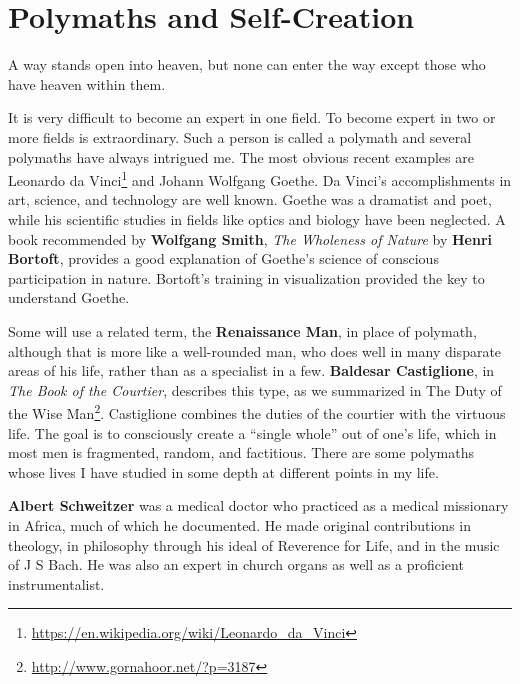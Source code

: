 \section{Polymaths and Self-Creation}

\begin{quotex}
A way stands open into heaven, but none can enter the way except those who have heaven within them.
\end{quotex}


It is very difficult to become an expert in one field. To become expert in two or more fields is extraordinary. Such a person is called a polymath and several polymaths have always intrigued me. The most obvious recent examples are Leonardo da Vinci\footnote{\url{https://en.wikipedia.org/wiki/Leonardo\_da\_Vinci}} and Johann Wolfgang Goethe. Da Vinci's accomplishments in art, science, and technology are well known. Goethe was a dramatist and poet, while his scientific studies in fields like optics and biology have been neglected. A book recommended by \textbf{Wolfgang Smith}, \emph{The Wholeness of Nature} by \textbf{Henri Bortoft}, provides a good explanation of Goethe's science of conscious participation in nature. Bortoft's training in visualization provided the key to understand Goethe.

Some will use a related term, the \textbf{Renaissance Man}, in place of polymath, although that is more like a well-rounded man, who does well in many disparate areas of his life, rather than as a specialist in a few. \textbf{Baldesar Castiglione}, in \emph{The Book of the Courtier}, describes this type, as we summarized in The Duty of the Wise Man\footnote{\url{http://www.gornahoor.net/?p=3187}}. Castiglione combines the duties of the courtier with the virtuous life. The goal is to consciously create a ``single whole'' out of one's life, which in most men is fragmented, random, and factitious. There are some polymaths whose lives I have studied in some depth at different points in my life.

\textbf{Albert Schweitzer} was a medical doctor who practiced as a medical missionary in Africa, much of which he documented. He made original contributions in theology, in philosophy through his ideal of Reverence for Life, and in the music of J S Bach. He was also an expert in church organs as well as a proficient instrumentalist.

